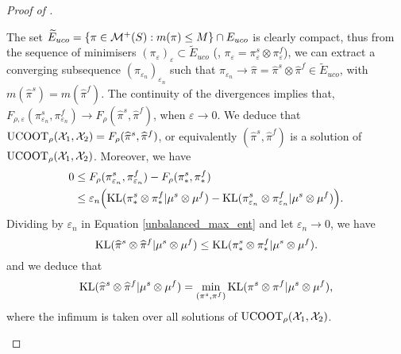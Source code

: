 \begin{proof}[Proof of ]
\begin{enumerate}
    The set $\widetilde{E}_{uco} = \{\pi \in \mathcal M^+(S): m(\pi) \leq M\} \cap E_{uco}$
    is clearly compact, thus from the sequence of minimisers
    $(\pi_{\varepsilon})_{\varepsilon} \subset \widetilde{E}_{uco}$
    (\ie, $\pi_{\varepsilon} = \pi_{\varepsilon}^s \otimes \pi_{\varepsilon}^f$), we can extract a
    converging subsequence $(\pi_{\varepsilon_n})_{\varepsilon_n}$ such that
    $\pi_{\varepsilon_n} \to \widehat{\pi} = \widehat{\pi}^s \otimes \widehat{\pi}^f \in \widetilde{E}_{uco}$,
    with $m(\widehat{\pi}^s) = m(\widehat{\pi}^f)$.
    The continuity of the divergences implies that,
    $F_{\rho, \varepsilon}(\pi_{\varepsilon_n}^s, \pi_{\varepsilon_n}^f) \to
    F_{\rho}(\widehat{\pi}^s, \widehat{\pi}^f)$, when $\varepsilon \to 0$. We deduce that
    $\text{UCOOT}_{\rho}(\mathcal X_1, \mathcal X_2) = F_{\rho}(\widehat{\pi}^s, \widehat{\pi}^f)$,
    or equivalently $(\widehat{\pi}^s, \widehat{\pi}^f)$
    is a solution of $\text{UCOOT}_{\rho}(\mathcal X_1, \mathcal X_2)$. Moreover, we have
    \begin{equation} \label{unbalanced_max_ent}
      \begin{split}
        0 &\leq F_{\rho}(\pi_{\varepsilon_n}^s, \pi_{\varepsilon_n}^f)
        - F_{\rho}(\pi_*^s, \pi_*^f) \\
      &\leq \varepsilon_n \Big( \text{KL}(\pi_*^s \otimes \pi_*^f \vert \mu^s \otimes \mu^f) -
      \text{KL}(\pi_{\varepsilon_n}^s \otimes \pi_{\varepsilon_n}^f \vert \mu^s \otimes \mu^f) \Big).
      \end{split}
    \end{equation}
    Dividing by $\varepsilon_n$ in Equation \eqref{unbalanced_max_ent} and let
    $\varepsilon_n \to 0$, we have
    \begin{equation}
      \text{KL}(\widehat{\pi}^s \otimes \widehat{\pi}^f \vert \mu^s \otimes \mu^f) \leq
      \text{KL}(\pi_*^s \otimes \pi_*^f \vert \mu^s \otimes \mu^f).
    \end{equation}
    and we deduce that
    \begin{equation}
      \text{KL}(\widehat{\pi}^s \otimes \widehat{\pi}^f \vert \mu^s \otimes \mu^f) =
      \min_{(\pi^s, \pi^f)} \text{KL}(\pi^s \otimes \pi^f \vert \mu^s \otimes \mu^f),
    \end{equation}
    where the infimum is taken over all solutions of $\text{UCOOT}_{\rho}(\mathcal X_1, \mathcal X_2)$.
  \end{enumerate}
\end{proof}


